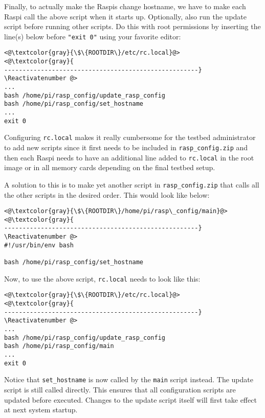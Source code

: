 Finally, to actually make the \ac{Raspi}s change hostname, we have to make
each \ac{Raspi} call the above script when it starts up. Optionally,
also run the update script before running other scripts.
Do this with root permissions by inserting the line(s) below before
\texttt{"exit 0"} using your favorite editor:

\Suppressnumber\begin{lstlisting}[]
<@\textcolor{gray}{\$\{ROOTDIR\}/etc/rc.local}@>
<@\textcolor{gray}{
-----------------------------------------------------}
\Reactivatenumber @>
...
bash /home/pi/rasp_config/update_rasp_config
bash /home/pi/rasp_config/set_hostname
...
exit 0
\end{lstlisting}
\FloatBarrier
\vspace{-5mm}

Configuring \texttt{rc.local} makes it really cumbersome for the testbed
administrator to add new scripts since it first needs to be included
in \texttt{rasp\_config.zip} and then each \ac{Raspi} needs to have an additional
line added to \texttt{rc.local} in the root image or in all memory cards depending on
the final testbed setup.

A solution to this is to make yet another script in \texttt{rasp\_config.zip}
that calls all the other scripts in the desired order. This would look like
below:
\Suppressnumber\begin{lstlisting}[]
<@\textcolor{gray}{\$\{ROOTDIR\}/home/pi/rasp\_config/main}@>
<@\textcolor{gray}{
-----------------------------------------------------}
\Reactivatenumber @>
#!/usr/bin/env bash

bash /home/pi/rasp_config/set_hostname
\end{lstlisting}
\FloatBarrier
\vspace{-5mm}

Now, to use the above script, \texttt{rc.local} needs to look like this:
\Suppressnumber\begin{lstlisting}[]
<@\textcolor{gray}{\$\{ROOTDIR\}/etc/rc.local}@>
<@\textcolor{gray}{
-----------------------------------------------------}
\Reactivatenumber @>
...
bash /home/pi/rasp_config/update_rasp_config
bash /home/pi/rasp_config/main
...
exit 0
\end{lstlisting}
\FloatBarrier
\vspace{-5mm}
Notice that \texttt{set\_hostname} is now called by the \texttt{main}
script instead. The update script is still called directly. This ensures that
all configuration scripts are updated before executed. Changes to the update
script itself will first take effect at next system startup.

